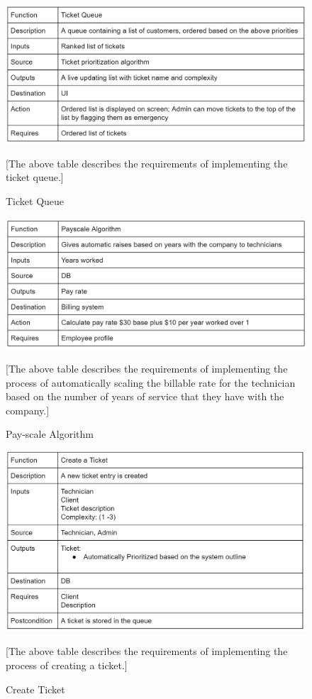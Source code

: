 \documentclass[letterpaper]{article}
\begin{document}
\begin{figure}[htbp]
  \includegraphics[scale = .5]{TicketQueue}
  \caption{Ticket Queue}[The above table describes the requirements of implementing the ticket queue.]
  \centering
\end{figure}

\begin{figure}[htbp]
  \includegraphics[scale = .5]{PayscaleAlg}
  \caption{Pay-scale Algorithm}[The above table describes the requirements of implementing the process of automatically scaling the billable rate for the technician based on the number of years of service that they have with the company.]
  \centering
\end{figure}

\begin{figure}[htbp]
  \includegraphics[scale = .5]{MakeTicket}
  \caption{Create Ticket}[The above table describes the requirements of implementing the process of creating a ticket.]
  \centering
\end{figure}
\end{document}
